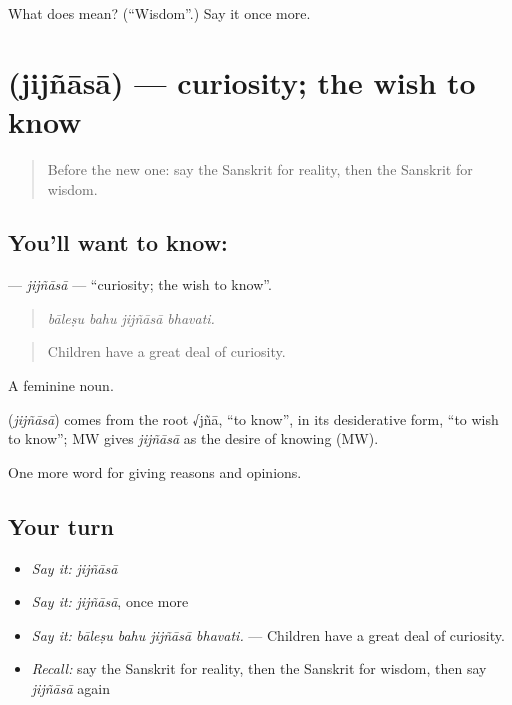 \begin{tcolorbox}[breakable,colback=teal!4,colframe=teal!35!black,title={Before you move on}]
What does  mean? (\textquotedblleft{}Wisdom\textquotedblright{}.) Say it once more.
\end{tcolorbox}
\section[\texorpdfstring{\sk{जिज्ञासा} (jijñāsā)}{जिज्ञासा (jijñāsā)}]{ (jijñāsā) — curiosity; the wish to know}

\label{lesson:SA-C365-jijnasa}



\begin{quote}
Before the new one: say the Sanskrit for reality, then the Sanskrit for wisdom.
\end{quote}

\subsection*{You'll want to know: }
\textbf{} — \emph{jijñāsā} — \textquotedblleft{}curiosity; the wish to know\textquotedblright{}.

\begin{quote}
   
\end{quote}

\begin{quote}
\emph{bāleṣu bahu jijñāsā bhavati.}
\end{quote}

\begin{quote}
Children have a great deal of curiosity.
\end{quote}

A feminine noun.

\begin{cousinweb}
\textbf{} (\emph{jijñāsā}) comes from the root √jñā, \textquotedblleft{}to know\textquotedblright{}, in its desiderative form, \textquotedblleft{}to wish to know\textquotedblright{}; MW gives \emph{jijñāsā} as the desire of knowing (MW).
\end{cousinweb}

\begin{grammarlens}[title={What you've built}]
One more word for giving reasons and opinions.
\end{grammarlens}

\subsection*{Your turn}
\begin{itemize}
\raggedright
  \item \emph{Say it:} \emph{jijñāsā}
  \item \emph{Say it:} \emph{jijñāsā}, once more
  \item \emph{Say it:} \emph{bāleṣu bahu jijñāsā bhavati.} — Children have a great deal of curiosity.
  \item \emph{Recall:} say the Sanskrit for reality, then the Sanskrit for wisdom, then say \emph{jijñāsā} again
\end{itemize}

